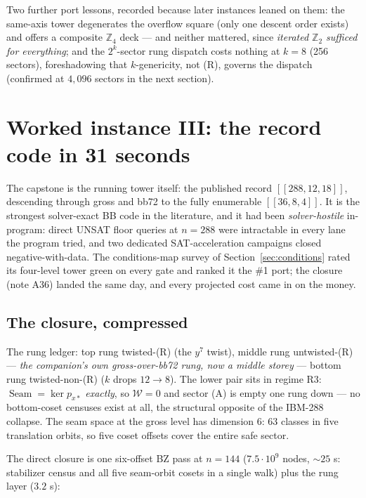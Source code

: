 \documentclass[11pt]{article}
\theoremstyle{plain}
\theoremstyle{definition}
\theoremstyle{remark}
\newcommand{\Z}{\mathbb{Z}}
\newcommand{\Seam}{\operatorname{Seam}}
\begin{document}
Two further port lessons, recorded because later instances leaned on
them: the same-axis tower degenerates the overflow square (only one
descent order exists) and offers a composite $\Z_4$ deck --- and neither
mattered, since \emph{iterated $\Z_2$ sufficed for everything}; and the
$2^{k}$-sector rung dispatch costs nothing at $k = 8$ (256 sectors),
foreshadowing that $k$-genericity, not (R), governs the dispatch
(confirmed at $4{,}096$ sectors in the next section).

\section{Worked instance III: the record code in 31 seconds}
\label{sec:bb288}

The capstone is the running tower itself: the published record
$[[288,12,18]]$, descending through gross and bb72 to the fully
enumerable $[[36,8,4]]$. It is the strongest solver-exact BB code in
the literature, and it had been \emph{solver-hostile} in-program: direct
UNSAT floor queries at $n = 288$ were intractable in every lane the
program tried, and two dedicated SAT-acceleration campaigns closed
negative-with-data. The conditions-map survey of
Section~\ref{sec:conditions} rated its four-level tower green on every
gate and ranked it the \#1 port; the closure (note A36) landed the same
day, and every projected cost came in on the money.

\subsection{The closure, compressed}

The rung ledger: top rung twisted-(R) (the $y^7$ twist), middle rung
untwisted-(R) --- \emph{the companion's own gross-over-bb72 rung, now a
middle storey} --- bottom rung twisted-non-(R) ($k$ drops $12 \to 8$).
The lower pair sits in regime R3: $\Seam = \ker p_{x*}$ \emph{exactly},
so $\mathcal{W} = 0$ and sector (A) is empty one rung down --- no
bottom-coset censuses exist at all, the structural opposite of the
IBM-288 collapse. The seam space at the gross level has dimension 6:
63 classes in five translation orbits, so five coset offsets cover the
entire safe sector.

The direct closure is one six-offset BZ pass at $n = 144$ ($7.5 \cdot
10^9$ nodes, ${\sim}25$ s: stabilizer census and all five seam-orbit
cosets in a single walk) plus the rung layer ($3.2$ s):
\end{document}
